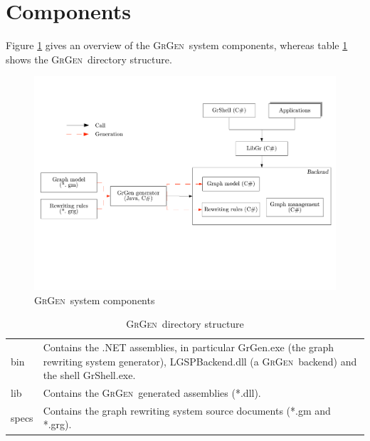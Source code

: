 \documentclass[a4paper,11pt]{report}
\providecommand{\GrG}{{\scshape GrGen}}
\begin{document}
\section{Components}
Figure \ref{figsys} gives an overview of the \GrG\ system components, whereas table \ref{dirstruc} shows the \GrG\ directory structure.
\begin{figure}[htbp]
  \centering
  \includegraphics[width=\textwidth]{fig/Overview}
  \caption{\GrG\ system components \cite{kroll}}
  \label{figsys}
\end{figure}

\begin{table}[htbp]
  \begin{tabularx}{\linewidth}{|lX|} \hline
  bin & Contains the .NET assemblies, in particular GrGen.exe (the graph rewriting system generator), LGSPBackend.dll (a \GrG\ backend) and the shell GrShell.exe.  \\ 
  lib & Contains the \GrG\ generated assemblies (*.dll). \\
  specs & Contains the graph rewriting system source documents (*.gm and *.grg). \\ \hline
  \end{tabularx}
  \caption{\GrG\ directory structure}
  \label{dirstruc}
\end{table}
\end{document}
